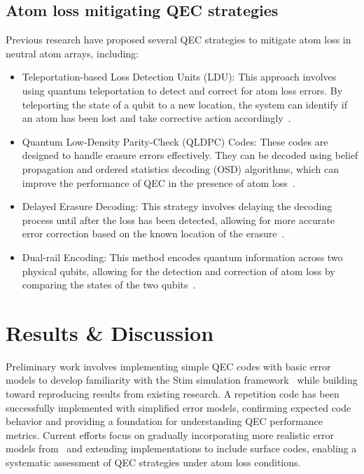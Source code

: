 \documentclass[aps,prb,twocolumn,superscriptaddress,nobibnotes]{revtex4-2} %
\begin{document}
\subsection{Atom loss mitigating QEC strategies}
Previous research have proposed several QEC strategies to mitigate atom loss in neutral atom arrays, including:

\begin{itemize}
    \item Teleportation-based Loss Detection Units (LDU): This approach involves using quantum teleportation to detect and correct for atom loss errors. By teleporting the state of a qubit to a new location, the system can identify if an atom has been lost and take corrective action accordingly~\cite{Perrin_2025}.
    \item Quantum Low-Density Parity-Check (QLDPC) Codes: These codes are designed to handle erasure errors effectively. They can be decoded using belief propagation and ordered statistics decoding (OSD) algorithms, which can improve the performance of QEC in the presence of atom loss~\cite{Roffe_2020}.
    \item Delayed Erasure Decoding: This strategy involves delaying the decoding process until after the loss has been detected, allowing for more accurate error correction based on the known location of the erasure~\cite{ycwc-3myc}.
    \item Dual-rail Encoding: This method encodes quantum information across two physical qubits, allowing for the detection and correction of atom loss by comparing the states of the two qubits~\cite{violaris2026developmentssuperconductingerasurequbits}.
\end{itemize}

\section{Results \& Discussion} %

Preliminary work involves implementing simple QEC codes with basic error models to develop familiarity with the Stim simulation framework~\cite{Gidney_2021} while building toward reproducing results from existing research.
A repetition code has been successfully implemented with simplified error models, confirming expected code behavior and providing a foundation for understanding QEC performance metrics. 
Current efforts focus on gradually incorporating more realistic error models from~\cite{Perrin_2025} and extending implementations to include surface codes, enabling a systematic assessment of QEC strategies under atom loss conditions.
\end{document}
